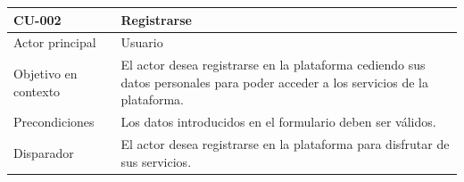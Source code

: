 \begin{table}[htpb]
\centering
\begin{tabularx}{\textwidth}{|l|X|}
\hline
\rowcolor[gray]{0.9}\textbf{CU-002}                            & \textbf{Registrarse}                                                                                                                                                                                                                                                                                                                                                                                                                    \\ \hline
Actor principal                   & Usuario                                                                                                                                                                                                                                                                                                                                                                                                                        \\ \hline
Objetivo en contexto              & El actor desea registrarse en la plataforma cediendo sus datos personales para poder acceder a los servicios de la plataforma.                                                                                                                                                                                                                                                                                                 \\ \hline
Precondiciones                    & Los datos introducidos en el formulario deben ser válidos.                                                                                                                                                                                                                                                                                                                                                                     \\ \hline
Disparador                        & El actor desea registrarse en la plataforma para disfrutar de sus servicios.                                                                                                                                                                                                                                                                                                                                                   \\ \hline

\end{tabularx}
\end{table}
